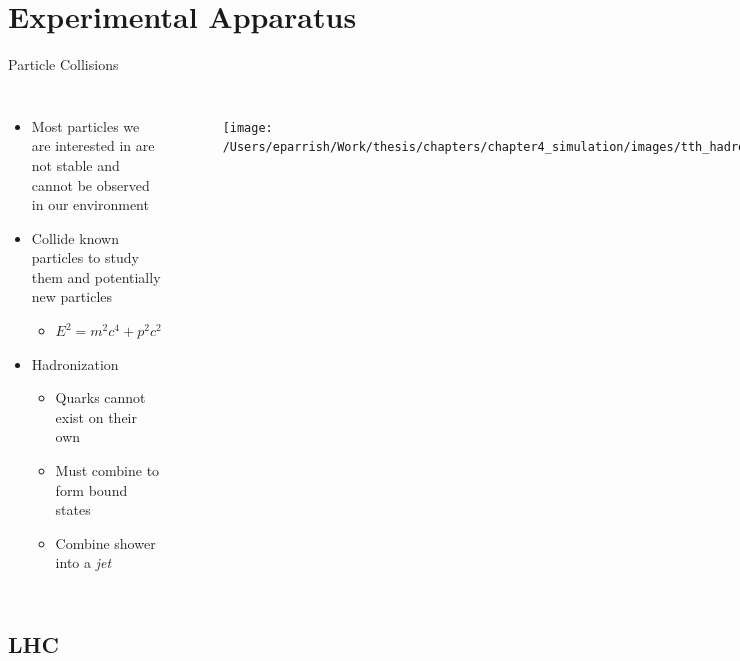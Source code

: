 \documentclass[aspectratio=169,xcolor=table]{beamer}
\begin{document}
\section{Experimental Apparatus }

  \begin{frame}[t]{Particle Collisions}
    \begin{columns}[t]
        \begin{itemize}
          \item Most particles we are interested in are not stable and cannot be observed in our environment
          \item Collide known particles to study them and potentially new particles
            \begin{itemize}
              \item $E^2 = m^2c^4 + p^2c^2$
            \end{itemize}
          \item Hadronization
          \begin{itemize}
            \item Quarks cannot exist on their own
            \item Must combine to form bound states
            \item Combine shower into a \textit{jet}
          \end{itemize}
        \end{itemize}

        \begin{figure}
        \centering
        \texttt{[image: /Users/eparrish/Work/thesis/chapters/chapter4\_simulation/images/tth\_hadronization\_gen.png]}
        \caption{\tiny \cite{Wanotayaroj:2242196}}
        \end{figure}

    \end{columns}
  \end{frame}

  \subsection{LHC }
\end{document}
